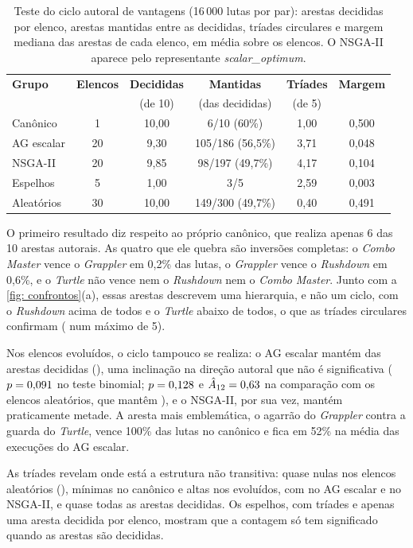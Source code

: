 \begin{table}[htb]
    \caption[Teste do ciclo autoral de vantagens]{Teste do ciclo autoral de vantagens (16\,000 lutas por par): arestas decididas por elenco, arestas mantidas entre as decididas, tríades circulares e margem mediana das arestas de cada elenco, em média sobre os elencos. O NSGA-II aparece pelo representante \textit{scalar\_optimum}.}
    \label{tab: ciclo}
    \centering
    \small
    \begin{tabular}{l c c c c c}
        \toprule
        \textbf{Grupo} & \textbf{Elencos} & \textbf{Decididas} & \textbf{Mantidas} & \textbf{Tríades} & \textbf{Margem} \\
        & & (de 10) & (das decididas) & (de 5) & \\
        \midrule
        Canônico    & 1  & 10,00 & 6/10 (60\%)        & 1,00 & 0,500 \\
        AG escalar  & 20 & 9,30  & 105/186 (56,5\%)   & 3,71 & 0,048 \\
        NSGA-II     & 20 & 9,85  & 98/197 (49,7\%)    & 4,17 & 0,104 \\
        Espelhos    & 5  & 1,00  & 3/5                & 2,59 & 0,003 \\
        Aleatórios  & 30 & 10,00 & 149/300 (49,7\%)   & 0,40 & 0,491 \\
        \bottomrule
    \end{tabular}
    \source
\end{table}

O primeiro resultado diz respeito ao próprio canônico, que realiza apenas 6 das 10 arestas autorais. As quatro que ele quebra são inversões completas: o \textit{Combo Master} vence o \textit{Grappler} em 0,2\% das lutas, o \textit{Grappler} vence o \textit{Rushdown} em 0,6\%, e o \textit{Turtle} não vence nem o \textit{Rushdown} nem o \textit{Combo Master}. Junto com a \autoref{fig: confrontos}(a), essas arestas descrevem uma hierarquia, e não um ciclo, com o \textit{Rushdown} acima de todos e o \textit{Turtle} abaixo de todos, o que as tríades circulares confirmam (\triadesCanon{} num máximo de 5).

Nos elencos evoluídos, o ciclo tampouco se realiza: o AG escalar mantém \cicloMantidasAG{} das \cicloDecididasAG{} arestas decididas (\cicloTaxaAG{}), uma inclinação na direção autoral que não é significativa ($p = 0{,}091{}$ no teste binomial; $p = 0{,}128{}$ e $\hat{A}_{12} = 0{,}63{}$ na comparação com os elencos aleatórios, que mantêm \cicloTaxaNulos{}), e o NSGA-II, por sua vez, mantém praticamente metade. A aresta mais emblemática, o agarrão do \textit{Grappler} contra a guarda do \textit{Turtle}, vence 100\% das lutas no canônico e fica em 52\% na média das execuções do AG escalar.

As tríades revelam onde está a estrutura não transitiva: quase nulas nos elencos aleatórios (\triadesAleat{}), mínimas no canônico e altas nos evoluídos, com \triadesAG{} no AG escalar e \triadesNSGA{} no NSGA-II, e quase todas as arestas decididas. Os espelhos, com \triadesEspelho{} tríades e apenas uma aresta decidida por elenco, mostram que a contagem só tem significado quando as arestas são decididas.
